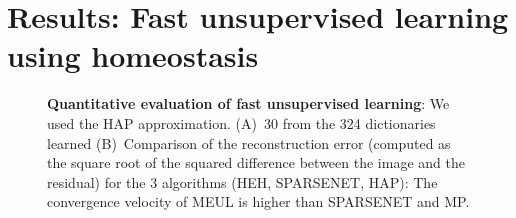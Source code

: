 \documentclass[a4paper, 11pt, draft]{article} %
\begin{document}
\section{Results: Fast unsupervised learning using homeostasis}\label{results}
\begin{figure}[!ht]%
\caption{
{\bf Quantitative evaluation of fast unsupervised learning}: We used the HAP approximation. %
 {\sf (A)}~30 from the 324 dictionaries learned {\sf (B)}~Comparison of the reconstruction error (computed as the square root of the squared difference between the image and the residual) for the 3 algorithms (HEH, SPARSENET, HAP): The convergence velocity of MEUL is higher than SPARSENET and MP.
\label{fig:HAP}}%
\end{figure}%
\end{document}
